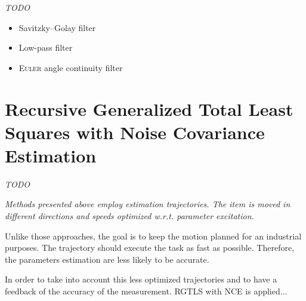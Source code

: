 \documentclass[/home/francois/latex/report/main.tex]{subfiles}
\begin{document}
\textit{TODO}

{\it
\begin{itemize}
  \item Savitzky–Golay filter
  \item Low-pass filter
  \item \textsc{Euler} angle continuity filter
\end{itemize}
}

\section{Recursive Generalized Total Least Squares with Noise Covariance Estimation}

\textit{TODO}

{\it
Methods presented above employ estimation trajectories. The item is moved in different directions and speeds optimized w.r.t. parameter excitation.

Unlike those approaches, the goal is to keep the motion planned for an industrial purposes. The trajectory should execute the task as fast as possible. Therefore, the parameters estimation are less likely to be accurate.

In order to take into account this less optimized trajectories and to have a feedback of the accuracy of the measurement. \ac{RGTLS} with \ac{NCE} is applied... \cite{Rhode2014}
}
\end{document}
